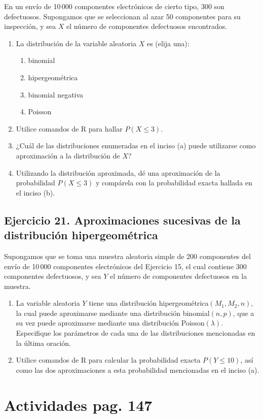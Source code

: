 \documentclass[10pt]{article}
\begin{document}
En un envío de 10\,000 componentes electrónicos de cierto tipo, 300 son defectuosos. Supongamos que se seleccionan al azar 50 componentes para su inspección, y sea $X$ el número de componentes defectuosos encontrados.

\begin{enumerate}[label=(\alph*)]
    \item La distribución de la variable aleatoria $X$ es (elija una):
    \begin{enumerate}[label=(\roman*)]
        \item binomial
        \item hipergeométrica
        \item binomial negativa
        \item Poisson
    \end{enumerate}

    \item Utilice comandos de R para hallar $P(X \leq 3)$.

    \item ¿Cuál de las distribuciones enumeradas en el inciso (a) puede utilizarse como aproximación a la distribución de $X$?

    \item Utilizando la distribución aproximada, dé una aproximación de la probabilidad $P(X \leq 3)$ y compárela con la probabilidad exacta hallada en el inciso (b).
\end{enumerate}

\subsection{Ejercicio 21. Aproximaciones sucesivas de la distribución hipergeométrica}

Supongamos que se toma una muestra aleatoria simple de 200 componentes del envío de 10\,000 componentes electrónicos del Ejercicio 15, el cual contiene 300 componentes defectuosos, y sea $Y$ el número de componentes defectuosos en la muestra.

\begin{enumerate}[label=(\alph*)]
    \item La variable aleatoria $Y$ tiene una distribución hipergeométrica$(M_1, M_2, n)$, la cual puede aproximarse mediante una distribución binomial$(n, p)$, que a su vez puede aproximarse mediante una distribución Poisson$(\lambda)$. Especifique los parámetros de cada una de las distribuciones mencionadas en la última oración.

    \item Utilice comandos de R para calcular la probabilidad exacta $P(Y \leq 10)$, así como las dos aproximaciones a esta probabilidad mencionadas en el inciso (a).
\end{enumerate}

\section{Actividades pag. 147}
\end{document}

